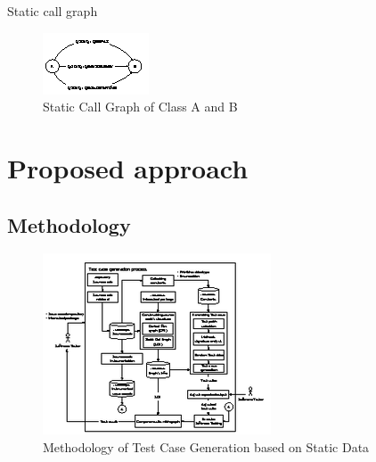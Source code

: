 \documentclass{beamer}
\begin{document}
\begin{frame}{Static call graph}
    \begin{figure}
        \includegraphics[width=0.8\paperwidth]{figure/SCG-A-and-B}
        \caption{Static Call Graph of Class A and B}
        \label{fig:staticCallGraphAandB}
    \end{figure}
\end{frame}


%
% 


%
\section{Proposed approach}
\subsection{Methodology}
\begin{frame}
    \begin{figure}
        \includegraphics[height=0.8\paperheight]{figure/Methodology}
        \caption{Methodology of Test Case Generation based on Static Data}
        \label{fig:methodologyOverview}
    \end{figure}
\end{frame}
\end{document}
